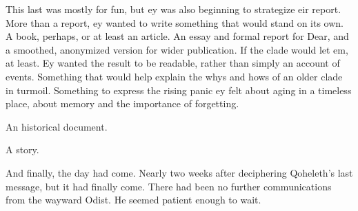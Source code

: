 This last was mostly for fun, but ey was also beginning to strategize eir report. More than a report, ey wanted to write something that would stand on its own. A book, perhaps, or at least an article. An essay and formal report for Dear, and a smoothed, anonymized version for wider publication. If the clade would let em, at least. Ey wanted the result to be readable, rather than simply an account of events. Something that would help explain the whys and hows of an older clade in turmoil. Something to express the rising panic ey felt about aging in a timeless place, about memory and the importance of forgetting.

An historical document.

A story.

And finally, the day had come. Nearly two weeks after deciphering Qoheleth's last message, but it had finally come. There had been no further communications from the wayward Odist. He seemed patient enough to wait.

